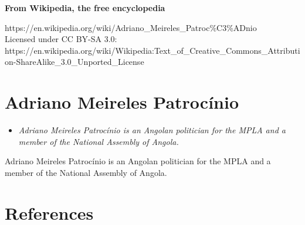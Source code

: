 \textbf{From Wikipedia, the free encyclopedia}

https://en.wikipedia.org/wiki/Adriano\_Meireles\_Patroc\%C3\%ADnio\\
Licensed under CC BY-SA 3.0:\\
https://en.wikipedia.org/wiki/Wikipedia:Text\_of\_Creative\_Commons\_Attribution-ShareAlike\_3.0\_Unported\_License

\section{Adriano Meireles
Patrocínio}\label{adriano-meireles-patrocuxednio}

\begin{itemize}
\item
  \emph{Adriano Meireles Patrocínio is an Angolan politician for the
  MPLA and a member of the National Assembly of Angola.}
\end{itemize}

Adriano Meireles Patrocínio is an Angolan politician for the MPLA and a
member of the National Assembly of Angola.

\section{References}\label{references}
